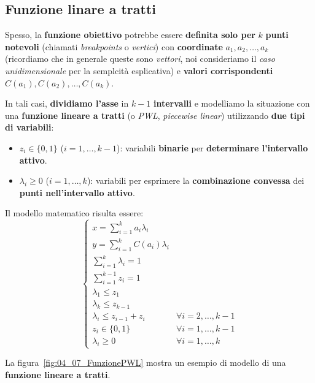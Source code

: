 \subsection{Funzione linare a tratti}

Spesso, la \textbf{funzione obiettivo} potrebbe essere \textbf{definita solo per} 
$k$ \textbf{punti notevoli} (chiamati \textit{breakpoints} o \textit{vertici}) con
\textbf{coordinate} $a_{1},a_{2},\ldots , a_k$ (ricordiamo che in generale queste sono \textit{vettori}, 
noi consideriamo il \textit{caso unidimensionale} per la semplcità esplicativa) e
\textbf{valori corrispondenti} $C(a_{1}),C(a_{2}),\ldots ,C(a_k)$.

In tali casi, \textbf{dividiamo l'asse} in $k-1$ \textbf{intervalli} e modelliamo
la situazione con una \textbf{funzione lineare a tratti} 
(o \textit{PWL}, \textit{piecewise linear}) utilizzando \textbf{due tipi di variabili}:
\begin{itemize}
    \item $z_i\in \{0,1\}$ ($i=1,\ldots ,k-1$): variabili \textbf{binarie} 
        per \textbf{determinare l'intervallo attivo}.
    \item $\lambda_i \ge 0$ ($i=1,\ldots ,k$): variabili per esprimere la 
        \textbf{combinazione convessa} dei \textbf{punti nell'intervallo attivo}.
\end{itemize}

\begin{definition}
    Il modello matematico risulta essere:
    \[
        \begin{cases}
            x = \sum_{i=1}^k a_i \lambda_i \\ 
            y = \sum_{i=1}^k C(a_i)\lambda_i \\ 
            \sum_{i=1}^k \lambda_i = 1 \\ 
            \sum_{i=1}^{k-1} z_i = 1 \\ 
            \lambda_1 \le z_{1} \\ 
            \lambda_k \le z_{k-1} \\ 
            \lambda_i \le z_{i-1} + z_i & \forall i = 2,\ldots ,k-1 \\ 
            z_i \in \{0,1\} & \forall i = 1,\ldots ,k-1 \\ 
            \lambda_i \ge 0 & \forall i =1,\ldots ,k
        \end{cases}
    \] 
\end{definition}

La figura~\ref{fig:04_07_FunzionePWL} mostra un esempio di modello di una 
\textbf{funzione lineare a tratti}.

